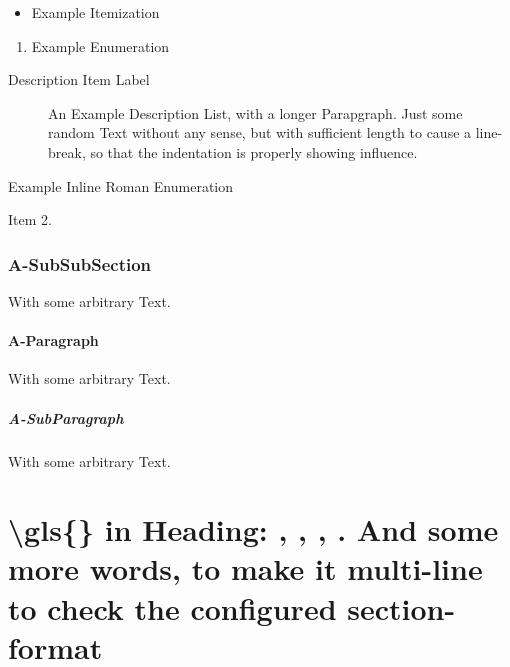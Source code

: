 \begin{itemize}
\item%
	Example Itemization
\end{itemize}
\begin{enumerate}
\item%
	Example Enumeration
\end{enumerate}
\begin{description}
\item[Description Item Label]%
	An Example Description List, with a longer Parapgraph. Just some random Text without any sense, but with sufficient length to cause a line-break, so that the indentation is properly showing influence.
\end{description}
\begin{enuminlrom}
\item%
	Example Inline Roman Enumeration
\item%
	Item 2.
\end{enuminlrom}


\subsubsection{A-SubSubSection}
With some arbitrary Text.

\paragraph{A-Paragraph}
With some arbitrary Text.

\subparagraph{A-SubParagraph}
With some arbitrary Text.





\section{\textbackslash gls\{\} in Heading:
	\texorpdfstring{}{DLL},
	\texorpdfstring{}{DLL},
	\texorpdfstring{}{DLLs},
	\texorpdfstring{}{DLLs}.
	And some more words, to make it multi-line to check the configured section-format
}


